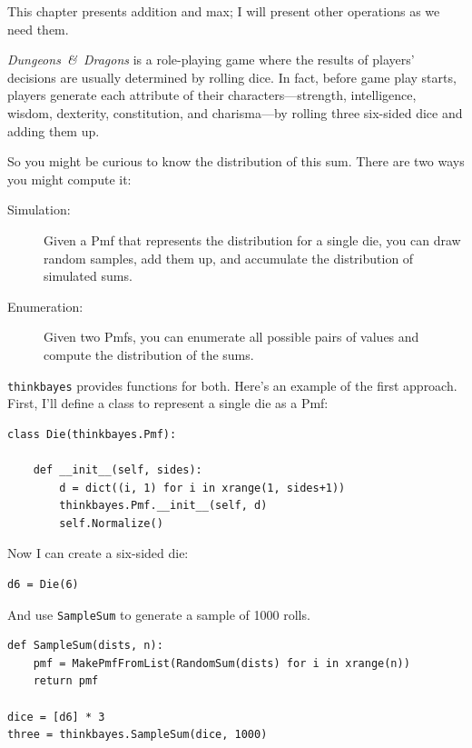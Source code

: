 \documentclass[12pt]{book}
\begin{document}
This chapter presents addition and max; I will present
other operations as we need them.

{\it Dungeons~\&~Dragons} is a role-playing game where the results
of players' decisions are usually determined by rolling dice.
In fact, before game play starts, players generate each
attribute of their characters---strength, intelligence, wisdom,
dexterity, constitution, and charisma---by rolling three
six-sided dice and adding them up.

So you might be curious to know the distribution of this sum.
There are two ways you might compute it:

\begin{description}

\item[Simulation:] Given a Pmf that represents the distribution
for a single die, you can draw random samples, add them up,
and accumulate the distribution of simulated sums.

\item[Enumeration:] Given two Pmfs, you can enumerate all possible
pairs of values and compute the distribution of the sums.

\end{description}

\verb"thinkbayes" provides functions for both.  Here's an example
of the first approach.  First, I'll define a class to represent
a single die as a Pmf:

\begin{verbatim}
class Die(thinkbayes.Pmf):

    def __init__(self, sides):
        d = dict((i, 1) for i in xrange(1, sides+1))
        thinkbayes.Pmf.__init__(self, d)
        self.Normalize()
\end{verbatim}

Now I can create a six-sided die:

\begin{verbatim}
d6 = Die(6)
\end{verbatim}

And use \verb"SampleSum" to generate a sample of 1000 rolls.

\begin{verbatim}
def SampleSum(dists, n):
    pmf = MakePmfFromList(RandomSum(dists) for i in xrange(n))
    return pmf

dice = [d6] * 3
three = thinkbayes.SampleSum(dice, 1000)
\end{verbatim}
\end{document}
